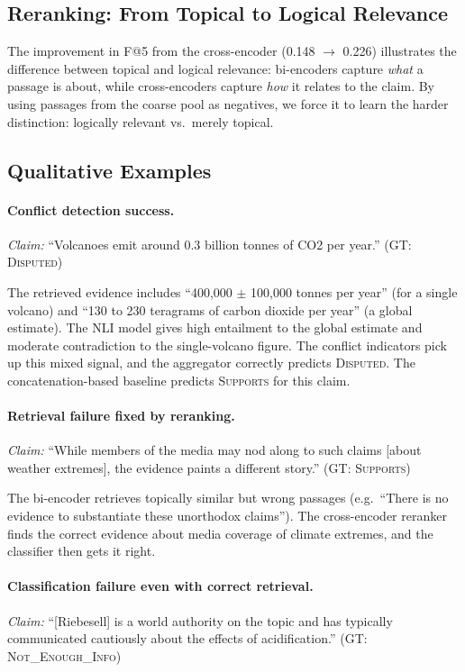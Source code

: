 \documentclass[11pt]{article}
\begin{document}
\subsection{Reranking: From Topical to Logical Relevance}

The improvement in F@5 from the cross-encoder (0.148 $\to$ 0.226)
illustrates the difference between topical and logical relevance:
bi-encoders capture \emph{what} a passage is about, while
cross-encoders capture \emph{how} it relates to the claim.
By using passages from the coarse pool as negatives, we force it to
learn the harder distinction: logically relevant vs.\ merely topical.

\subsection{Qualitative Examples}

\paragraph{Conflict detection success.}
\emph{Claim:} ``Volcanoes emit around 0.3 billion tonnes of CO2 per
year.'' (GT: \textsc{Disputed})

The retrieved evidence includes ``400,000 $\pm$ 100,000 tonnes per
year'' (for a single volcano) and ``130 to 230 teragrams of carbon
dioxide per year'' (a global estimate).
The NLI model gives high entailment to the global estimate and moderate
contradiction to the single-volcano figure.
The conflict indicators pick up this mixed signal, and the aggregator
correctly predicts \textsc{Disputed}.
The concatenation-based baseline predicts \textsc{Supports} for this
claim.

\paragraph{Retrieval failure fixed by reranking.}
\emph{Claim:} ``While members of the media may nod along to such claims
[about weather extremes], the evidence paints a different story.''
(GT: \textsc{Supports})

The bi-encoder retrieves topically similar but wrong passages (e.g.\
``There is no evidence to substantiate these unorthodox claims'').
The cross-encoder reranker finds the correct evidence about media
coverage of climate extremes, and the classifier then gets it right.

\paragraph{Classification failure even with correct retrieval.}
\emph{Claim:} ``[Riebesell] is a world authority on the topic and has
typically communicated cautiously about the effects of acidification.''
(GT: \textsc{Not\_Enough\_Info})
\end{document}
